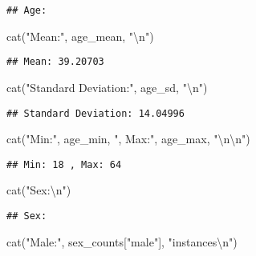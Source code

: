 \documentclass[
]{article}
\newenvironment{Shaded}{\begin{snugshade}}{\end{snugshade}}
\newcommand{\FunctionTok}[1]{\textcolor[rgb]{0.00,0.00,0.00}{#1}}
\newcommand{\NormalTok}[1]{#1}
\newcommand{\SpecialCharTok}[1]{\textcolor[rgb]{0.00,0.00,0.00}{#1}}
\newcommand{\StringTok}[1]{\textcolor[rgb]{0.31,0.60,0.02}{#1}}
\begin{document}
\begin{verbatim}
## Age:
\end{verbatim}

\begin{Shaded}
\begin{Highlighting}[]
\FunctionTok{cat}\NormalTok{(}\StringTok{"Mean:"}\NormalTok{, age\_mean, }\StringTok{"}\SpecialCharTok{\textbackslash{}n}\StringTok{"}\NormalTok{)}
\end{Highlighting}
\end{Shaded}

\begin{verbatim}
## Mean: 39.20703
\end{verbatim}

\begin{Shaded}
\begin{Highlighting}[]
\FunctionTok{cat}\NormalTok{(}\StringTok{"Standard Deviation:"}\NormalTok{, age\_sd, }\StringTok{"}\SpecialCharTok{\textbackslash{}n}\StringTok{"}\NormalTok{)}
\end{Highlighting}
\end{Shaded}

\begin{verbatim}
## Standard Deviation: 14.04996
\end{verbatim}

\begin{Shaded}
\begin{Highlighting}[]
\FunctionTok{cat}\NormalTok{(}\StringTok{"Min:"}\NormalTok{, age\_min, }\StringTok{", Max:"}\NormalTok{, age\_max, }\StringTok{"}\SpecialCharTok{\textbackslash{}n\textbackslash{}n}\StringTok{"}\NormalTok{)}
\end{Highlighting}
\end{Shaded}

\begin{verbatim}
## Min: 18 , Max: 64
\end{verbatim}

\begin{Shaded}
\begin{Highlighting}[]
\FunctionTok{cat}\NormalTok{(}\StringTok{"Sex:}\SpecialCharTok{\textbackslash{}n}\StringTok{"}\NormalTok{)}
\end{Highlighting}
\end{Shaded}

\begin{verbatim}
## Sex:
\end{verbatim}

\begin{Shaded}
\begin{Highlighting}[]
\FunctionTok{cat}\NormalTok{(}\StringTok{"Male:"}\NormalTok{, sex\_counts[}\StringTok{"male"}\NormalTok{], }\StringTok{"instances}\SpecialCharTok{\textbackslash{}n}\StringTok{"}\NormalTok{)}
\end{Highlighting}
\end{Shaded}
\end{document}

